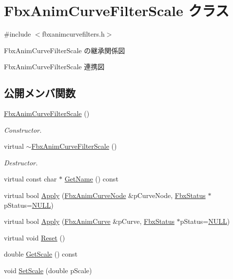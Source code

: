 \hypertarget{class_fbx_anim_curve_filter_scale}{}\section{Fbx\+Anim\+Curve\+Filter\+Scale クラス}
\label{class_fbx_anim_curve_filter_scale}


{\ttfamily \#include $<$fbxanimcurvefilters.\+h$>$}



Fbx\+Anim\+Curve\+Filter\+Scale の継承関係図


Fbx\+Anim\+Curve\+Filter\+Scale 連携図
\subsection*{公開メンバ関数}
\begin{DoxyCompactItemize}
\item 
\hyperlink{class_fbx_anim_curve_filter_scale_a8ac5600b1b34f191cb4cab040d9d2ef9}{Fbx\+Anim\+Curve\+Filter\+Scale} ()
\begin{DoxyCompactList}\small\item\em Constructor. \end{DoxyCompactList}\item 
virtual \hyperlink{class_fbx_anim_curve_filter_scale_a2fa5db669596368d0b8cecff75468005}{$\sim$\+Fbx\+Anim\+Curve\+Filter\+Scale} ()
\begin{DoxyCompactList}\small\item\em Destructor. \end{DoxyCompactList}\item 
virtual const char $\ast$ \hyperlink{class_fbx_anim_curve_filter_scale_afffa13f0b3bbdcaa0a6d88d6aea2c83f}{Get\+Name} () const
\item 
virtual bool \hyperlink{class_fbx_anim_curve_filter_scale_abec5cc73d37bef6e8ab3127ed09b21a3}{Apply} (\hyperlink{class_fbx_anim_curve_node}{Fbx\+Anim\+Curve\+Node} \&p\+Curve\+Node, \hyperlink{class_fbx_status}{Fbx\+Status} $\ast$p\+Status=\hyperlink{fbxarch_8h_a070d2ce7b6bb7e5c05602aa8c308d0c4}{N\+U\+LL})
\item 
virtual bool \hyperlink{class_fbx_anim_curve_filter_scale_a1d3234359a5766b4476e4a0522104d77}{Apply} (\hyperlink{class_fbx_anim_curve}{Fbx\+Anim\+Curve} \&p\+Curve, \hyperlink{class_fbx_status}{Fbx\+Status} $\ast$p\+Status=\hyperlink{fbxarch_8h_a070d2ce7b6bb7e5c05602aa8c308d0c4}{N\+U\+LL})
\item 
virtual void \hyperlink{class_fbx_anim_curve_filter_scale_a40e82207d205b026aaab40e52a7184c8}{Reset} ()
\item 
double \hyperlink{class_fbx_anim_curve_filter_scale_a48367ab8cb65db9bffdda7dc8c0afff8}{Get\+Scale} () const
\item 
void \hyperlink{class_fbx_anim_curve_filter_scale_a9c564c7599541607c42d28bb57874eae}{Set\+Scale} (double p\+Scale)
\end{DoxyCompactItemize}
